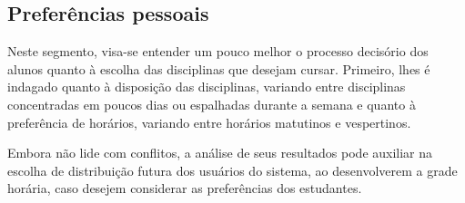 \begin{apendicesenv}
  \subsection{Preferências pessoais} %

  Neste segmento, visa-se entender um pouco melhor o processo decisório dos alunos quanto à escolha das disciplinas que desejam cursar. Primeiro, lhes é indagado quanto à disposição das disciplinas, variando entre disciplinas concentradas em poucos dias ou espalhadas durante a semana e quanto à preferência de horários, variando entre horários matutinos e vespertinos.

  Embora não lide com conflitos, a análise de seus resultados pode auxiliar na escolha de distribuição futura dos usuários do sistema, ao desenvolverem a grade horária, caso desejem considerar as preferências dos estudantes.

\end{apendicesenv}
